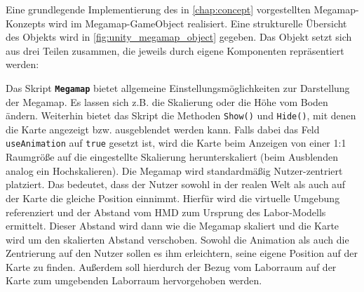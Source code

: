Eine grundlegende Implementierung des in \autoref{chap:concept} vorgestellten Megamap-Konzepts wird im Megamap-GameObject realisiert.
Eine strukturelle Übersicht des Objekts wird in \autoref{fig:unity_megamap_object} gegeben.
Das Objekt setzt sich aus drei Teilen zusammen, die jeweils durch eigene Komponenten repräsentiert werden:

Das Skript \textbf{\lstinline{Megamap}} bietet allgemeine Einstellungsmöglichkeiten zur Darstellung der Megamap.
Es lassen sich z.B. die Skalierung oder die Höhe vom Boden ändern.
Weiterhin bietet das Skript die Methoden \lstinline{Show()} und \lstinline{Hide()}, mit denen die Karte angezeigt bzw. ausgeblendet werden kann.
Falls dabei das Feld \lstinline{useAnimation} auf \lstinline{true} gesetzt ist, wird die Karte beim Anzeigen von einer 1:1 Raumgröße auf die eingestellte Skalierung herunterskaliert (beim Ausblenden analog ein Hochskalieren).
Die Megamap wird standardmäßig Nutzer-zentriert platziert.
Das bedeutet, dass der Nutzer sowohl in der realen Welt als auch auf der Karte die gleiche Position einnimmt.
Hierfür wird die virtuelle Umgebung referenziert und der Abstand vom HMD zum Ursprung des Labor-Modells ermittelt.
Dieser Abstand wird dann wie die Megamap skaliert und die Karte wird um den skalierten Abstand verschoben.
Sowohl die Animation als auch die Zentrierung auf den Nutzer sollen es ihm erleichtern, seine eigene Position auf der Karte zu finden.
Außerdem soll hierdurch der Bezug vom Laborraum auf der Karte zum umgebenden Laborraum hervorgehoben werden.

